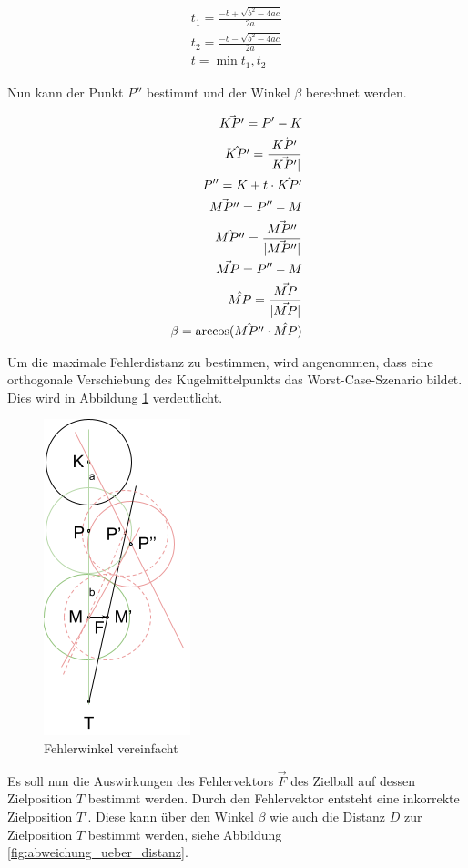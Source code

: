 \begin{align}
t_1 = \frac{-b + \sqrt{b^2 - 4ac}}{2a}\\
t_2 = \frac{-b - \sqrt{b^2 - 4ac}}{2a}\\
t = \min{t_1, t_2}
\end{align}

Nun kann der Punkt $P''$ bestimmt und der Winkel $\beta$ berechnet werden.

\begin{align}
    \vec{KP'} = P' - K\\
    \hat{KP'} = \frac{\vec{KP'}}{\lvert \vec{KP'} \rvert}\\
    P'' = K + t \cdot \hat{KP'}\\
    \vec{MP''} = P'' - M\\
    \hat{MP''} = \frac{\vec{MP''}}{\lvert \vec{MP''} \rvert}\\
    \vec{MP} = P'' - M\\
    \hat{MP} = \frac{\vec{MP}}{\lvert \vec{MP} \rvert}\\
    \beta = \arccos(\hat{MP''} \cdot \hat{MP})
\end{align}

Um die maximale Fehlerdistanz zu bestimmen, wird angenommen, dass eine orthogonale Verschiebung des Kugelmittelpunkts
das Worst-Case-Szenario bildet. Dies wird in Abbildung \ref{fig:fehlerwinkel_vereinfachung} verdeutlicht.

\begin{figure}[h!]
    \begin{center}
        \includegraphics[width=0.2\linewidth]{../common/07_appendix/resources/03_fehlerwinkel_vereinfacht.png}
    \end{center}
    \caption{Fehlerwinkel vereinfacht}
    \label{fig:fehlerwinkel_vereinfachung}
\end{figure}

Es soll nun die Auswirkungen des Fehlervektors $\vec{F}$ des Zielball auf dessen Zielposition $T$ bestimmt werden.
Durch den Fehlervektor entsteht eine inkorrekte Zielposition $T'$. Diese kann über den Winkel $\beta$ wie auch die Distanz $D$ zur
Zielposition $T$ bestimmt werden, siehe Abbildung \ref{fig:abweichung_ueber_distanz}.

